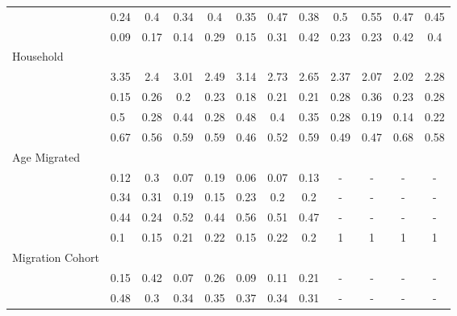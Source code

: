 \documentclass[
]{article}
\begin{document}
\begin{landscape}
\begin{table}[ht]
\begin{tabular}{>{\raggedright\arraybackslash}p{3.2cm}|lcccccc|cccc}
  \multicolumn{1}{>{\raggedleft\arraybackslash}p{2cm}|}{\makebox[2cm][r]{Secondary }}& 0.24 & 0.4 & 0.34 & 0.4 & 0.35 & 0.47 & 0.38 & 0.5 & 0.55 & 0.47 & 0.45 \\ 
  \multicolumn{1}{>{\raggedleft\arraybackslash}p{2cm}|}{\makebox[2cm][r]{University }}& 0.09 & 0.17 & 0.14 & 0.29 & 0.15 & 0.31 & 0.42 & 0.23 & 0.23 & 0.42 & 0.4 \\ 
  Household &  &  &  &  &  &  &  &  &  &  &  \\ 
  \multicolumn{1}{>{\raggedleft\arraybackslash}p{2.7cm}|}{\makebox[2.7cm][r]{Household Size }}& 3.35 & 2.4 & 3.01 & 2.49 & 3.14 & 2.73 & 2.65 & 2.37 & 2.07 & 2.02 & 2.28 \\ 
  \multicolumn{1}{>{\raggedleft\arraybackslash}p{2.2cm}|}{\makebox[2.2cm][r]{Lives Alone }}& 0.15 & 0.26 & 0.2 & 0.23 & 0.18 & 0.21 & 0.21 & 0.28 & 0.36 & 0.23 & 0.28 \\ 
  \multicolumn{1}{>{\raggedleft\arraybackslash}p{2.9cm}|}{\makebox[2.9cm][r]{Lives with Child }}& 0.5 & 0.28 & 0.44 & 0.28 & 0.48 & 0.4 & 0.35 & 0.28 & 0.19 & 0.14 & 0.22 \\ 
  \multicolumn{1}{>{\raggedleft\arraybackslash}p{3.4cm}|}{\makebox[3.4cm][r]{Married/Cohabiting }}& 0.67 & 0.56 & 0.59 & 0.59 & 0.46 & 0.52 & 0.59 & 0.49 & 0.47 & 0.68 & 0.58 \\ 
  Age Migrated &  &  &  &  &  &  &  &  &  &  &  \\ 
  \multicolumn{1}{>{\raggedleft\arraybackslash}p{2.4cm}|}{\makebox[2.4cm][r]{Less than 15 }}& 0.12 & 0.3 & 0.07 & 0.19 & 0.06 & 0.07 & 0.13 & - & - & - & - \\ 
  \multicolumn{1}{>{\raggedleft\arraybackslash}p{1.6cm}|}{\makebox[1.6cm][r]{15 - 23 }}& 0.34 & 0.31 & 0.19 & 0.15 & 0.23 & 0.2 & 0.2 & - & - & - & - \\ 
  \multicolumn{1}{>{\raggedleft\arraybackslash}p{1.6cm}|}{\makebox[1.6cm][r]{24 - 49 }}& 0.44 & 0.24 & 0.52 & 0.44 & 0.56 & 0.51 & 0.47 & - & - & - & - \\ 
  \multicolumn{1}{>{\raggedleft\arraybackslash}p{2.6cm}|}{\makebox[2.6cm][r]{50 and Above }}& 0.1 & 0.15 & 0.21 & 0.22 & 0.15 & 0.22 & 0.2 & 1 & 1 & 1 & 1 \\ 
  Migration Cohort &  &  &  &  &  &  &  &  &  &  &  \\ 
  \multicolumn{1}{>{\raggedleft\arraybackslash}p{2.3cm}|}{\makebox[2.3cm][r]{Before 1965 }}& 0.15 & 0.42 & 0.07 & 0.26 & 0.09 & 0.11 & 0.21 & - & - & - & - \\ 
  \multicolumn{1}{>{\raggedleft\arraybackslash}p{2.2cm}|}{\makebox[2.2cm][r]{1965 - 1979 }}& 0.48 & 0.3 & 0.34 & 0.35 & 0.37 & 0.34 & 0.31 & - & - & - & - \\ 

\end{tabular}
\end{table}
\end{landscape}
\end{document}
